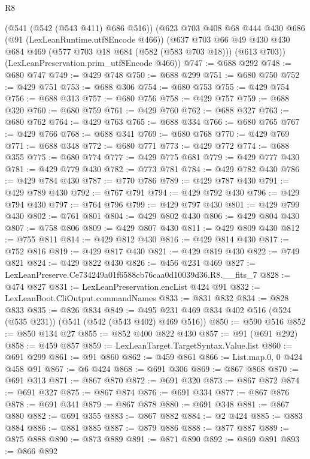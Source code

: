 \begin{lexlean}{R8}
\begin{coremodule}
    (@541 (@542 (@543 @411) @686 @516))
    (@623
      @703
      @408
      @68
      @444
      @430
      @686
      (@91 (LexLeanRuntime.utf8Encode @466))
      (@637
        @703
        @66
        @49
        @430
        @430
        @684
        @469
        (@577 @703 @18 @684 (@582 (@583 @703 @18)))
        (@613 @703))
      (LexLeanPreservation.prim_utf8Encode @466))
@747 := @688 @292
@748 := @680 @747
@749 := @429 @748
@750 := @688 @299
@751 := @680 @750
@752 := @429 @751
@753 := @688 @306
@754 := @680 @753
@755 := @429 @754
@756 := @688 @313
@757 := @680 @756
@758 := @429 @757
@759 := @688 @320
@760 := @680 @759
@761 := @429 @760
@762 := @688 @327
@763 := @680 @762
@764 := @429 @763
@765 := @688 @334
@766 := @680 @765
@767 := @429 @766
@768 := @688 @341
@769 := @680 @768
@770 := @429 @769
@771 := @688 @348
@772 := @680 @771
@773 := @429 @772
@774 := @688 @355
@775 := @680 @774
@777 := @429 @775 @681
@779 := @429 @777 @430
@781 := @429 @779 @430
@782 := @773 @781
@784 := @429 @782 @430
@786 := @429 @784 @430
@787 := @770 @786
@789 := @429 @787 @430
@791 := @429 @789 @430
@792 := @767 @791
@794 := @429 @792 @430
@796 := @429 @794 @430
@797 := @764 @796
@799 := @429 @797 @430
@801 := @429 @799 @430
@802 := @761 @801
@804 := @429 @802 @430
@806 := @429 @804 @430
@807 := @758 @806
@809 := @429 @807 @430
@811 := @429 @809 @430
@812 := @755 @811
@814 := @429 @812 @430
@816 := @429 @814 @430
@817 := @752 @816
@819 := @429 @817 @430
@821 := @429 @819 @430
@822 := @749 @821
@824 := @429 @822 @430
@826 := @456 @231 @469
@827 := LexLeanPreserve.Ce734249a01f6588cb76caa0d10039d36.R8.__fits_7
@828 := @474 @827
@831 := LexLeanPreservation.encList @424 @91
@832 := LexLeanBoot.CliOutput.commandNames
@833 := @831 @832
@834 := @828 @833
@835 := @826 @834
@849 := @495 @231 @469 @834 @402 @516 (@524 (@535 @231)) (@541 (@542 (@543 @402) @469 @516))
@850 := @590 @516
@852 := @850 @134 @27
@855 := @852 @400 @822 @430
@857 := @91 (@691 @292)
@858 := @459 @857
@859 := LexLeanTarget.TargetSyntax.Value.list
@860 := @691 @299
@861 := @91 @860
@862 := @459 @861
@866 := List.map.{0, 0} @424 @458 @91
@867 := @6 @424
@868 := @691 @306
@869 := @867 @868
@870 := @691 @313
@871 := @867 @870
@872 := @691 @320
@873 := @867 @872
@874 := @691 @327
@875 := @867 @874
@876 := @691 @334
@877 := @867 @876
@878 := @691 @341
@879 := @867 @878
@880 := @691 @348
@881 := @867 @880
@882 := @691 @355
@883 := @867 @882
@884 := @2 @424
@885 := @883 @884
@886 := @881 @885
@887 := @879 @886
@888 := @877 @887
@889 := @875 @888
@890 := @873 @889
@891 := @871 @890
@892 := @869 @891
@893 := @866 @892

\end{coremodule}
\end{lexlean}
